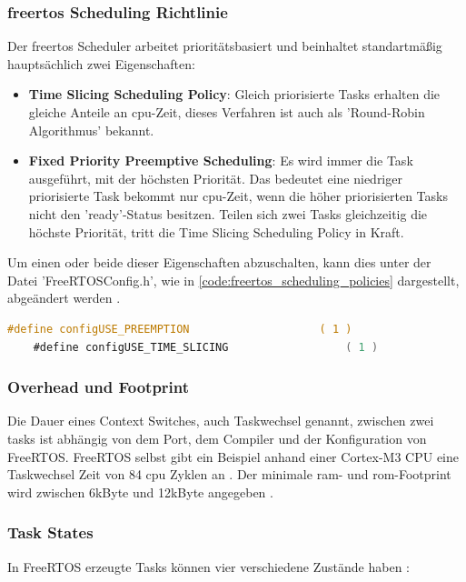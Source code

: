 \documentclass[../EDF Master Thesis.tex]{subfiles}
\begin{document}
\subsubsection{\ac{freertos} Scheduling Richtlinie}
Der \ac{freertos} Scheduler arbeitet prioritätsbasiert und beinhaltet standartmäßig hauptsächlich zwei Eigenschaften:
\begin{itemize}
    \item \textbf{Time Slicing Scheduling Policy}: Gleich priorisierte Tasks erhalten die gleiche Anteile an \ac{cpu}-Zeit, dieses Verfahren ist auch als 'Round-Robin Algorithmus' bekannt.
    \item \textbf{Fixed Priority Preemptive Scheduling}: Es wird immer die Task ausgeführt, mit der höchsten Priorität.
                                                         Das bedeutet eine niedriger priorisierte Task bekommt nur \ac{cpu}-Zeit, wenn die höher priorisierten Tasks nicht den 'ready'-Status besitzen.
                                                         Teilen sich zwei Tasks gleichzeitig die höchste Priorität, tritt die Time Slicing Scheduling Policy in Kraft.
\end{itemize}
Um einen oder beide dieser Eigenschaften abzuschalten, kann dies unter der Datei 'FreeRTOSConfig.h', wie in \autoref{code:freertos_scheduling_policies} dargestellt, abgeändert werden \parencite{freertos-scheduling-policy}.
\begin{lstlisting}[language=C, caption=FreeRTOS Scheduling Policy Properties, label=code:freertos_scheduling_policies]
    #define configUSE_PREEMPTION                    ( 1 )
    #define configUSE_TIME_SLICING                  ( 1 )
\end{lstlisting}


\subsubsection{Overhead und Footprint}
Die Dauer eines Context Switches, auch Taskwechsel genannt, zwischen zwei tasks ist abhängig von dem Port, dem Compiler und der Konfiguration von FreeRTOS.
FreeRTOS selbst gibt ein Beispiel anhand einer Cortex-M3 CPU eine Taskwechsel Zeit von 84 \ac{cpu} Zyklen an \parencite{freertos-overhead}.
Der minimale \ac{ram}- und \ac{rom}-Footprint wird zwischen 6kByte und 12kByte angegeben \parencite{freertos-footprint}.

\subsubsection{Task States}
In FreeRTOS erzeugte Tasks können vier verschiedene Zustände haben \parencite{freertos-task-states}:
\end{document}
